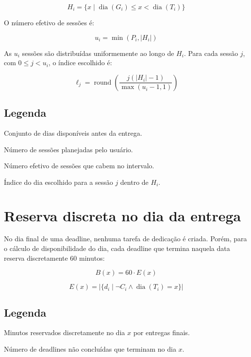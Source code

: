 \documentclass[12pt,a4paper]{article}
\begin{document}
\[
H_i = \{x \mid \operatorname{dia}(G_i) \leq x < \operatorname{dia}(T_i)\}
\]

O número efetivo de sessões é:

\[
u_i = \min(P_i, |H_i|)
\]

As $u_i$ sessões são distribuídas uniformemente ao longo de $H_i$. Para cada sessão $j$, com $0 \leq j < u_i$, o índice escolhido é:

\[
\ell_j =
\operatorname{round}
\left(
\frac{j(|H_i|-1)}{\max(u_i-1,1)}
\right)
\]

\subsection*{Legenda}

\begin{description}[leftmargin=2.2cm]
    \item[$H_i$] Conjunto de dias disponíveis antes da entrega.
    \item[$P_i$] Número de sessões planejadas pelo usuário.
    \item[$u_i$] Número efetivo de sessões que cabem no intervalo.
    \item[$\ell_j$] Índice do dia escolhido para a sessão $j$ dentro de $H_i$.
\end{description}

\section{Reserva discreta no dia da entrega}

No dia final de uma deadline, nenhuma tarefa de dedicação é criada. Porém, para o cálculo de disponibilidade do dia, cada deadline que termina naquela data reserva discretamente $60$ minutos:

\[
B(x) = 60 \cdot E(x)
\]

\[
E(x) =
\left|
\{d_i \mid \neg C_i \land \operatorname{dia}(T_i) = x\}
\right|
\]

\subsection*{Legenda}

\begin{description}[leftmargin=2.2cm]
    \item[$B(x)$] Minutos reservados discretamente no dia $x$ por entregas finais.
    \item[$E(x)$] Número de deadlines não concluídas que terminam no dia $x$.
\end{description}
\end{document}
